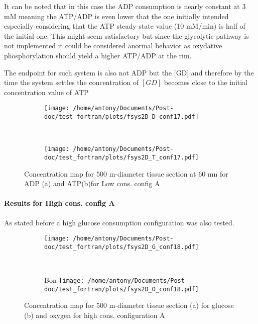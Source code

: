 \documentclass[11pt,a4paper]{article}
\begin{document}
It can be noted that in this case the ADP consumption is nearly constant at 3 mM meaning the ATP/ADP is even lower that the one initially intended especially considering that the ATP steady-state value (10 mM/min) is half of the initial one. This might seem satisfactory but since the glycolytic pathway is not implemented it could be considered anormal behavior as oxydative phosphorylation should yield a higher ATP/ADP at the rim.

The endpoint for such system is also not ADP but the [GD] and therefore by the time the system settles the concentration of $[GD]$ becomes close to the initial concentration value of ATP

\begin{figure}[ht!]
	\begin{subfigure}{0.45\textwidth}
	\centering
	\texttt{[image: /home/antony/Documents/Post-doc/test\_fortran/plots/fsys2D\_D\_conf17.pdf]}
	\caption{ \label{D_conf17}}
	\end{subfigure}
	~~
	\begin{subfigure}{0.45\textwidth}
	\texttt{[image: /home/antony/Documents/Post-doc/test\_fortran/plots/fsys2D\_T\_conf17.pdf]}
		\caption{ \label{T_conf17}}
	\end{subfigure}
	\caption{Concentration map for 500 \textmu m-diameter tissue section at 60 mn for ADP (a) and ATP(b)for Low cons. config A \label{DTconf17}}
\end{figure} 

\paragraph{Results for High cons. config A}
As stated before a high glucose consumption configuration was also tested. 

\begin{figure}[ht!]
	\begin{subfigure}{0.45\textwidth}
	\centering
	\texttt{[image: /home/antony/Documents/Post-doc/test\_fortran/plots/fsys2D\_G\_conf18.pdf]}
	\caption{ \label{G_conf18}}
	\end{subfigure}
	~~
	\begin{subfigure}{0.45\textwidth}
Bon	\texttt{[image: /home/antony/Documents/Post-doc/test\_fortran/plots/fsys2D\_O\_conf18.pdf]}
		\caption{ \label{O_conf18}}
	\end{subfigure}
	\caption{Concentration map for 500 \textmu m-diameter tissue section  (a) for glucose (b) and oxygen \label{conf18} for high cons. configuration A}
\end{figure} 
\end{document}
